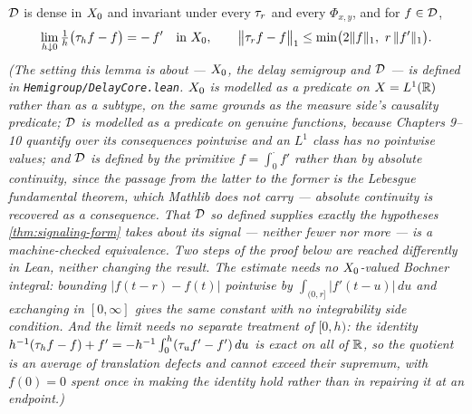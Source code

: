 \begin{lemma}\label{lem:delay-core}
\leanok
$\mathcal{D}$ is dense in $X_0$ and invariant under every $\tau_r$ and every $\Phi_{x,y}$, and for
$f \in \mathcal{D}$,
\[
  \lim_{h \downarrow 0} \tfrac{1}{h}\bigl(\shift_h f - f\bigr) = -\,f' \quad \text{in } \Xz,
  \qquad
  \bigl\|\shift_r f - f\bigr\|_1 \le \min\bigl(2\|f\|_1,\ r\,\|f'\|_1\bigr).
\]
\statusT\quad\emph{(The setting this lemma is about --- $X_0$, the delay semigroup and $\mathcal{D}$
--- is defined in \texttt{Hemigroup/DelayCore.lean}. $X_0$ is modelled as a predicate on
$X = L^1(\mathbb{R})$ rather than as a subtype, on the same grounds as the measure side's causality
predicate; $\mathcal{D}$ is modelled as a predicate on genuine functions, because Chapters 9--10
quantify over its consequences \emph{pointwise} and an $L^1$ class has no pointwise values; and
$\mathcal{D}$ is defined by the primitive $f = \int_0^{\cdot} f'$ rather than by absolute continuity,
since the passage from the latter to the former is the Lebesgue fundamental theorem, which
Mathlib does not carry --- absolute continuity is recovered as a consequence. That $\mathcal{D}$ so
defined supplies exactly the hypotheses \ref{thm:signaling-form} takes about its signal ---
neither fewer nor more --- is a machine-checked equivalence.
Two steps of the proof below are reached differently in Lean, neither changing the result. The
estimate needs no $X_0$-valued Bochner integral: bounding $|f(t-r)-f(t)|$ pointwise by
$\int_{(0,r]}|f'(t-u)|\,du$ and exchanging in $[0,\infty]$ gives the same constant with no
integrability side condition. And the limit needs no separate treatment of $[0,h)$: the identity
$h^{-1}(\tau_hf-f)+f' = -h^{-1}\int_0^h (\tau_uf'-f')\,du$ is exact on all of $\mathbb{R}$, so the quotient is
an \emph{average} of translation defects and cannot exceed their supremum, with $f(0)=0$ spent
once in making the identity hold rather than in repairing it at an endpoint.)}
\end{lemma}

